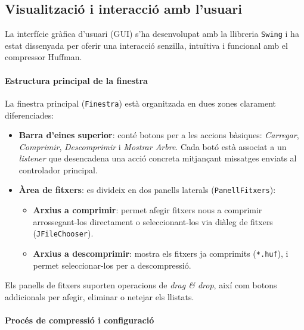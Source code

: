 \documentclass{ieeetj}
\begin{document}
\subsection{Visualització i interacció amb l'usuari}

La interfície gràfica d’usuari (GUI) s’ha desenvolupat amb la llibreria \texttt{Swing} i ha estat dissenyada per oferir una interacció senzilla, intuïtiva i funcional amb el compressor Huffman.

\paragraph{Estructura principal de la finestra}

La finestra principal (\texttt{Finestra}) està organitzada en dues zones clarament diferenciades:
\begin{itemize}
    \item \textbf{Barra d’eines superior}: conté botons per a les accions bàsiques: \emph{Carregar}, \emph{Comprimir}, \emph{Descomprimir} i \emph{Mostrar Arbre}. Cada botó està associat a un \emph{listener} que desencadena una acció concreta mitjançant missatges enviats al controlador principal.
    
    \item \textbf{Àrea de fitxers}: es divideix en dos panells laterals (\texttt{PanellFitxers}):
    \begin{itemize}
        \item \textbf{Arxius a comprimir}: permet afegir fitxers nous a comprimir arrossegant-los directament o seleccionant-los via diàleg de fitxers (\texttt{JFileChooser}).
        \item \textbf{Arxius a descomprimir}: mostra els fitxers ja comprimits (\texttt{*.huf}), i permet seleccionar-los per a descompressió.
    \end{itemize}
\end{itemize}

Els panells de fitxers suporten operacions de \emph{drag \& drop}, així com botons addicionals per afegir, eliminar o netejar els llistats.

\paragraph{Procés de compressió i configuració}
\end{document}
